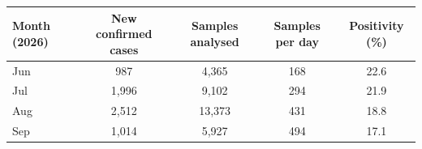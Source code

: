 \begin{tabular}{@{}lcccc@{}}
\toprule
Month (2026) & New confirmed cases & Samples analysed & Samples per day & Positivity (\%) \\
\midrule
Jun & 987 & 4,365 & 168 & 22.6 \\
Jul & 1,996 & 9,102 & 294 & 21.9 \\
Aug & 2,512 & 13,373 & 431 & 18.8 \\
Sep & 1,014 & 5,927 & 494 & 17.1 \\
\bottomrule
\end{tabular}
